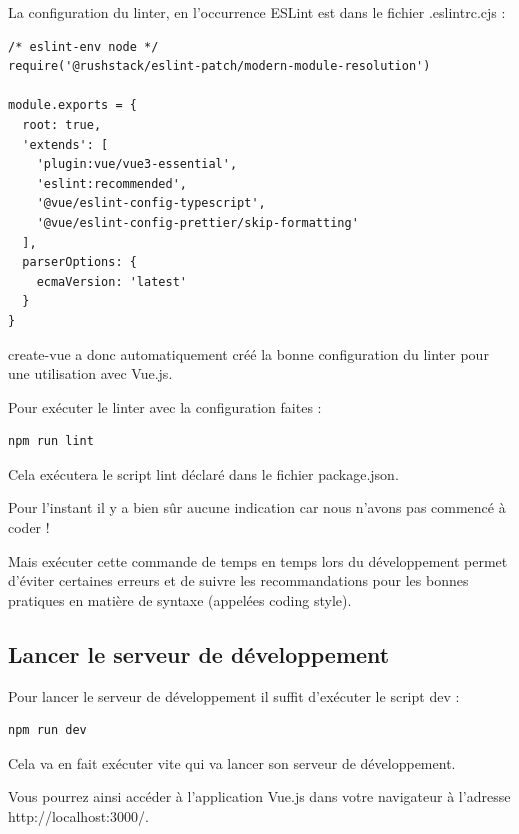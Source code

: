 \documentclass{article}
\begin{document}
La configuration du linter, en l'occurrence ESLint est dans le fichier .eslintrc.cjs :
\begin{verbatim}
/* eslint-env node */
require('@rushstack/eslint-patch/modern-module-resolution')

module.exports = {
  root: true,
  'extends': [
    'plugin:vue/vue3-essential',
    'eslint:recommended',
    '@vue/eslint-config-typescript',
    '@vue/eslint-config-prettier/skip-formatting'
  ],
  parserOptions: {
    ecmaVersion: 'latest'
  }
}
\end{verbatim}

create-vue a donc automatiquement créé la bonne configuration du linter pour une utilisation avec Vue.js.

Pour exécuter le linter avec la configuration faites :

\begin{verbatim}
npm run lint
\end{verbatim}     

Cela exécutera le script lint déclaré dans le fichier package.json.

Pour l'instant il y a bien sûr aucune indication car nous n'avons pas commencé à coder !

Mais exécuter cette commande de temps en temps lors du développement permet d'éviter certaines erreurs et de suivre les recommandations pour les bonnes pratiques en matière de syntaxe (appelées coding style).

\subsection{Lancer le serveur de développement}
Pour lancer le serveur de développement il suffit d'exécuter le script dev :
\begin{verbatim}
npm run dev
\end{verbatim} 

Cela va en fait exécuter vite qui va lancer son serveur de développement.

Vous pourrez ainsi accéder à l'application Vue.js dans votre navigateur à l'adresse http://localhost:3000/.
\end{document}
